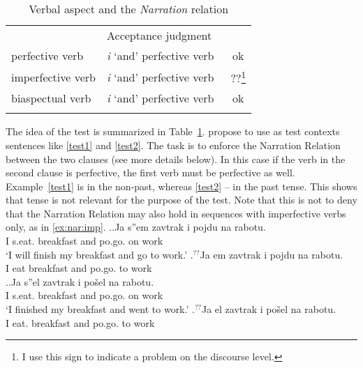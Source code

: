 \begin{table}
\caption{\label{table}Verbal aspect and the \textit{Narration} relation}
\begin{tabular}{llc}
\lsptoprule
\multicolumn{2}{c}{Verbal combination}& Acceptance judgment\\\cmidrule(r){1-2}\cmidrule(l){3-3}
perfective verb & \textit{i} `and' perfective verb~ & ok\\
imperfective verb & \textit{i} `and' perfective verb~ & ??\footnote{I use this sign to indicate a problem on the discourse level.}\\
biaspectual verb & \textit{i} `and' perfective verb~ & ok\\
\lspbottomrule
\end{tabular}
\end{table}

The idea of the test is summarized in Table~\ref{table}. \citet{ZinovaFilip:13} propose to use as test contexts sentences like \ref{test1} and \ref{test2}. The task is to enforce the Narration Relation  between the two clauses (see more details below). In this case if the verb in the second clause is perfective, the first verb must be perfective as well. Example~\ref{test1} is in the non-past, whereas \ref{test2} -- in the past tense. This shows that tense is not relevant for the purpose of the test. Note that this is not to deny that the Narration Relation may also hold in sequences with imperfective verbs only, as in \ref{ex:nar:imp}.
\ex.\label{test1}\ag.\label{test11}Ja s''em\textsuperscript{\PF} zavtrak i pojdu\textsuperscript{\PF} na rabotu.\\
I s.eat. breakfast and po.go. on work\\
\trans `I will finish my breakfast and go to work.'
\bg.\label{test12}$^{??}$Ja em\textsuperscript{\IPF} zavtrak i pojdu\textsuperscript{\PF} na rabotu.\\ 
I eat breakfast and po.go. to work\\

\ex.\label{test2}\ag.\label{test21}Ja s''el\textsuperscript{\PF} zavtrak i po\v{s}el\textsuperscript{\PF} na rabotu.\\
I s.eat. breakfast and po.go. on work\\
\trans `I finished my breakfast and went to work.'
\bg.\label{test22}$^{??}$Ja el\textsuperscript{\IPF} zavtrak i po\v{s}el\textsuperscript{\PF} na rabotu.\\
I eat. breakfast and po.go. to work\\

